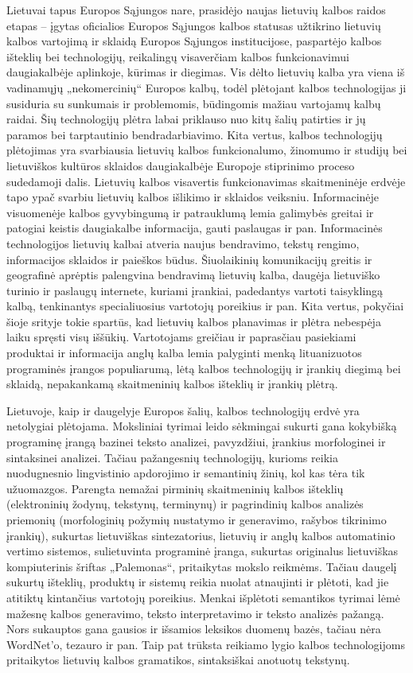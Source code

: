 \begin{multicols}{2}
Lietuvai tapus Europos Sąjungos nare, prasidėjo naujas lietuvių kalbos raidos etapas – įgytas oficialios Europos Sąjungos kalbos statusas užtikrino lietuvių kalbos vartojimą ir sklaidą Europos Sąjungos institucijose, paspartėjo kalbos išteklių bei technologijų, reikalingų visaverčiam kalbos funkcionavimui daugiakalbėje aplinkoje, kūrimas ir diegimas. Vis dėlto lietuvių kalba yra viena iš vadinamųjų „nekomercinių“ Europos kalbų, todėl plėtojant kalbos technologijas ji susiduria su sunkumais ir problemomis, būdingomis mažiau vartojamų kalbų   raidai. Šių technologijų plėtra labai priklauso nuo kitų šalių patirties ir jų paramos bei tarptautinio bendradarbiavimo. Kita vertus, kalbos technologijų plėtojimas yra svarbiausia lietuvių kalbos funkcionalumo, žinomumo ir studijų bei lietuviškos kultūros sklaidos daugiakalbėje Europoje stiprinimo proceso sudedamoji dalis. Lietuvių kalbos visavertis funkcionavimas skaitmeninėje erdvėje tapo ypač svarbiu lietuvių kalbos išlikimo ir sklaidos veiksniu. 
Informacinėje visuomenėje kalbos gyvybingumą ir patrauklumą lemia galimybės greitai ir patogiai keistis daugiakalbe informacija, gauti paslaugas ir pan.  Informacinės technologijos lietuvių kalbai atveria naujus bendravimo, tekstų rengimo, informacijos sklaidos ir paieškos būdus. Šiuolaikinių komunikacijų greitis ir geografinė aprėptis palengvina bendravimą lietuvių kalba, daugėja lietuviško turinio ir paslaugų internete, kuriami įrankiai, padedantys vartoti taisyklingą kalbą, tenkinantys specialiuosius vartotojų poreikius ir pan. Kita vertus, pokyčiai šioje srityje tokie spartūs, kad lietuvių kalbos planavimas ir plėtra nebespėja laiku spręsti visų iššūkių. Vartotojams greičiau ir paprasčiau pasiekiami produktai ir informacija anglų kalba lemia palyginti menką lituanizuotos programinės įrangos populiarumą, lėtą kalbos technologijų ir įrankių diegimą bei sklaidą, nepakankamą skaitmeninių kalbos išteklių ir įrankių plėtrą. 

Lietuvoje, kaip ir daugelyje Europos šalių, kalbos technologijų erdvė yra netolygiai plėtojama. Moksliniai tyrimai leido sėkmingai sukurti gana kokybišką programinę įrangą bazinei teksto analizei, pavyzdžiui, įrankius morfologinei ir sintaksinei analizei. Tačiau pažangesnių technologijų, kurioms reikia nuodugnesnio lingvistinio apdorojimo ir semantinių žinių, kol kas tėra tik užuomazgos. Parengta nemažai pirminių skaitmeninių kalbos išteklių (elektroninių žodynų, tekstynų, terminynų) ir pagrindinių kalbos analizės priemonių (morfologinių požymių nustatymo ir generavimo, rašybos tikrinimo įrankių), sukurtas lietuviškas sintezatorius, lietuvių ir anglų kalbos automatinio vertimo sistemos, sulietuvinta programinė įranga, sukurtas originalus lietuviškas kompiuterinis šriftas „Palemonas“, pritaikytas mokslo reikmėms. Tačiau daugelį sukurtų išteklių, produktų ir sistemų reikia nuolat atnaujinti ir plėtoti, kad jie atitiktų kintančius vartotojų poreikius. Menkai išplėtoti semantikos tyrimai lėmė mažesnę kalbos generavimo, teksto interpretavimo ir teksto analizės pažangą. Nors sukauptos gana gausios ir išsamios leksikos duomenų bazės, tačiau nėra WordNet’o, tezauro ir pan. Taip pat trūksta reikiamo lygio kalbos technologijoms pritaikytos lietuvių kalbos gramatikos, sintaksiškai anotuotų tekstynų.  


\end{multicols}
